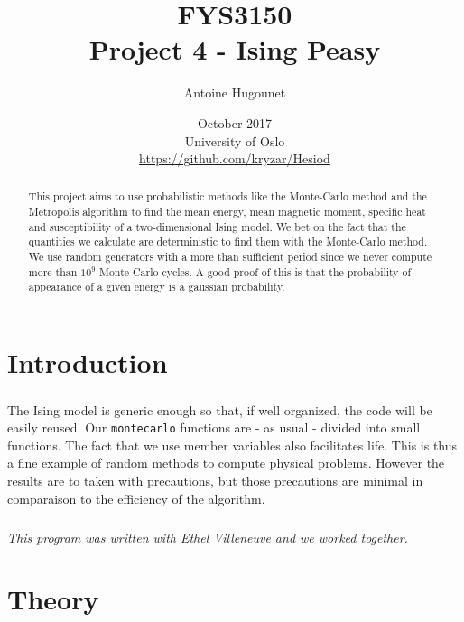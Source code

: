 \documentclass[a4paper, twoside, 11pt]{report}
\title{FYS3150\\Project 4 - Ising Peasy}
\author{Antoine Hugounet}
\date{October 2017 \\University of Oslo \\ \url{https://github.com/kryzar/Hesiod}}
\theoremstyle{theorem}
\theoremstyle{remark}
\theoremstyle{exemple}
\begin{document}
\maketitle
	
	
\begin{abstract}
    
    \paragraph{}This project aims to use probabilistic methods like the Monte-Carlo method and the Metropolis algorithm to find the mean energy, mean magnetic moment, specific heat and susceptibility of a two-dimensional Ising model. We bet on the fact that the quantities we calculate are deterministic to find them with the Monte-Carlo method. We use random generators with a more than sufficient period since we never compute more than ${10}^{9}$ Monte-Carlo cycles. A good proof of this is that the probability of appearance of a given energy is a gaussian probability.
        
\end{abstract}


\tableofcontents


\chapter*{Introduction}

    \paragraph{}The Ising model is generic enough so that, if well organized, the code will be easily reused. Our \texttt{montecarlo} functions are - as usual - divided into small functions. The fact that we use member variables also facilitates life. This is thus a fine example of random methods to compute physical problems. However the results are to taken with precautions, but those precautions are minimal in comparaison to the efficiency of the algorithm.
    
    \paragraph{}\emph{This program was written with Ethel Villeneuve and we worked together.}
    

\chapter{Theory}
    
\end{document}
